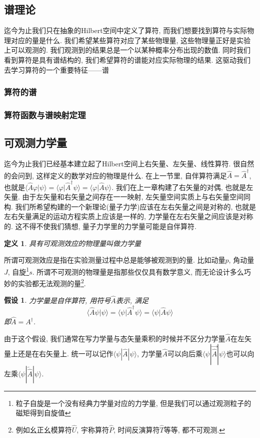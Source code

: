 \documentclass[a4paper,11pt]{article}
\newtheorem{definition}{\hspace{2em}定义}[section]
\newtheorem{hypothesis}{假设}[section]
\begin{document}
\subsection{谱理论}
迄今为止我们只在抽象的Hilbert空间中定义了算符, 而我们想要找到算符与实际物理对应的量是什么. 我们希望某些算符对应了某些物理量, 这些物理量正好是实验上可以观测的. 我们观测到的结果总是一个以某种概率分布出现的数值. 同时我们看到算符是具有谱结构的, 我们希望算符的谱能对应实际物理的结果. 这驱动我们去学习算符的一个重要特征------谱
\subsubsection{算符的谱}

\subsubsection{算符函数与谱映射定理}
\subsection{可观测力学量}
迄今为止我们已经基本建立起了Hilbert空间上右矢量、左矢量、线性算符. 很自然的会问到, 这样定义的数学对应的物理是什么. 在上一节里, 自伴算符满足$\hat{A}=\hat{A}^{\dag}$, 也就是$\langle\hat{A}\varphi|\psi\rangle=\langle\varphi|\hat{A}^{\dag}\psi\rangle=\langle\varphi|\hat{A}\psi\rangle$. 我们在上一章构建了右矢量的对偶, 也就是左矢量. 由于左矢量和右矢量之间存在一一映射, 左矢量空间实质上与右矢量空间同构. 我们所希望构建的一个新理论(量子力学)应该在左右矢量之间是对称的, 也就是左右矢量满足的运动方程实质上应该是一样的, 力学量在左右矢量之间应该是对称的. 这不得不使我们猜想, 量子力学里的力学量可能是自伴算符.
\begin{definition}
  具有可观测效应的物理量叫做力学量
\end{definition}
所谓可观测效应是指在实验测量过程中总是能够被观测到的量. 比如动量$p$, 角动量$J$, 自旋\footnote{粒子自旋是一个没有经典力学量对应的力学量, 但是我们可以通过观测粒子的磁矩得到自旋值}$s$. 所谓不可观测的物理量是指那些仅仅具有数学意义, 而无论设计多么巧妙的实验都无法观测的量\footnote{例如幺正幺模算符$\hat{U}$, 宇称算符$\hat{P}$, 时间反演算符$\hat{T}$等等, 都不可观测.}.
\begin{hypothesis}
  力学量是自伴算符, 用符号$\hat{A}$表示, 满足
\begin{equation*}
  \langle\hat{A}\psi|\psi\rangle=\langle\psi|\hat{A}^{\dag}\psi\rangle=\langle\psi|\hat{A}\psi\rangle
\end{equation*}
即$\hat{A}=A^{\dag}$.
\end{hypothesis}
由于这个假设, 我们通常在写力学量与态矢量乘积的时候并不区分力学量$\hat{A}$在左矢量上还是在右矢量上. 统一可以记作$\langle\psi|\hat{A}|\psi\rangle$, 力学量$\hat{A}$可以向后乘$\langle\psi|\overrightarrow{\hat{A}}|\psi\rangle$也可以向左乘$\langle\psi|\overleftarrow{\hat{A}}|\psi\rangle$.
\end{document}
